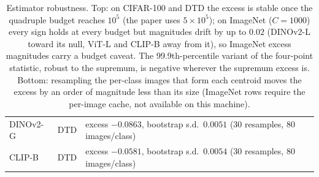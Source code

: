 \begin{table}[H]
\begin{tabular}{llcccccc|c}
DINOv2-G & DTD & \multicolumn{6}{l}{excess $-0.0863$, bootstrap s.d.\ $0.0051$ (30 resamples, 80 images/class)} & \\
CLIP-B & DTD & \multicolumn{6}{l}{excess $-0.0581$, bootstrap s.d.\ $0.0054$ (30 resamples, 80 images/class)} & \\
\bottomrule
\end{tabular}
\caption{Estimator robustness. Top: on CIFAR-100 and DTD the excess is stable once the quadruple budget reaches $10^5$ (the paper uses $5{\times}10^5$); on ImageNet ($C{=}1000$) every sign holds at every budget but magnitudes drift by up to $0.02$ (DINOv2-L toward its null, ViT-L and CLIP-B away from it), so ImageNet excess magnitudes carry a budget caveat. The 99.9th-percentile variant of the four-point statistic, robust to the supremum, is negative wherever the supremum excess is. Bottom: resampling the per-class images that form each centroid moves the excess by an order of magnitude less than its size (ImageNet rows require the per-image cache, not available on this machine).}
\label{tab:b15-robust}
\end{table}
